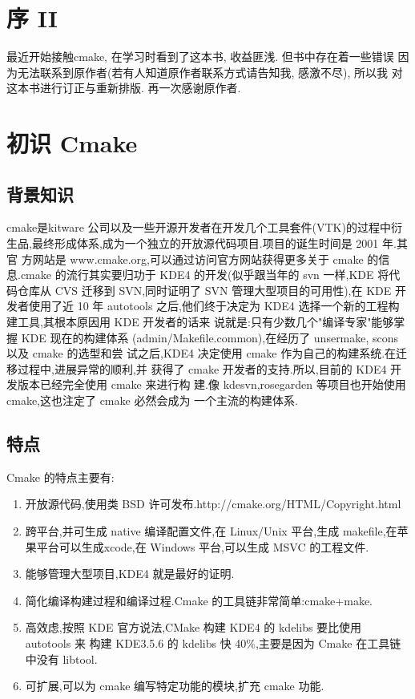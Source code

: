 \documentclass[oneside, 12pt]{book}
\begin{document}
 \chapter{序 II}
  最近开始接触cmake, 在学习时看到了这本书, 收益匪浅. 但书中存在着一些错误
  因为无法联系到原作者(若有人知道原作者联系方式请告知我, 感激不尽), 所以我
  对这本书进行订正与重新排版. 再一次感谢原作者.
\setcounter{chapter}{0}
  \renewcommand{\thechapter}{\arabic{chapter}}
  \chapter{初识 Cmake}
  \section{背景知识}
    cmake是kitware 公司以及一些开源开发者在开发几个工具套件(VTK)的过程中衍 生品,最终形成体系,成为一个独立的开放源代码项目.项目的诞生时间是 2001 年.其官 方网站是 www.cmake.org,可以通过访问官方网站获得更多关于 cmake 的信息.cmake 的流行其实要归功于 KDE4 的开发(似乎跟当年的 svn 一样,KDE 将代码仓库从 CVS 迁移到 SVN,同时证明了 SVN 管理大型项目的可用性),在 KDE 开发者使用了近 10 年 autotools 之后,他们终于决定为 KDE4 选择一个新的工程构建工具,其根本原因用 KDE 开发者的话来 说就是:只有少数几个"编译专家"能够掌握 KDE 现在的构建体系 (admin/Makefile.common),在经历了 unsermake, scons 以及 cmake 的选型和尝 试之后,KDE4 决定使用 cmake 作为自己的构建系统.在迁移过程中,进展异常的顺利,并 获得了 cmake 开发者的支持.所以,目前的 KDE4 开发版本已经完全使用 cmake 来进行构 建.像 kdesvn,rosegarden 等项目也开始使用 cmake,这也注定了 cmake 必然会成为 一个主流的构建体系.

\section{特点}
Cmake 的特点主要有: \\
\begin{enumerate}
  \item 开放源代码,使用类 BSD 许可发布.http://cmake.org/HTML/Copyright.html
  \item 跨平台,并可生成 native 编译配置文件,在 Linux/Unix 平台,生成 makefile,在苹果平台可以生成xcode,在 Windows 平台,可以生成 MSVC 的工程文件.
  \item 能够管理大型项目,KDE4 就是最好的证明.
  \item 简化编译构建过程和编译过程.Cmake 的工具链非常简单:cmake+make.
  \item 高效虑,按照 KDE 官方说法,CMake 构建 KDE4 的 kdelibs 要比使用 autotools 来 构建 KDE3.5.6 的 kdelibs 快 40\%,主要是因为 Cmake 在工具链中没有 libtool.
  \item 可扩展,可以为 cmake 编写特定功能的模块,扩充 cmake 功能.
\end{enumerate}
\end{document}
